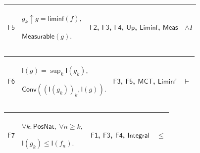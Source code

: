 \documentclass[11pt]{amsart}
\newlength{\FTCFourColumnBody}
\begin{document}
{\noindent
\begin{tabular}{|@{}>{\centering\arraybackslash}m{0.078431\FTCFourColumnBody}|>{\centering\arraybackslash}m{0.535947\FTCFourColumnBody}|>{\centering\arraybackslash}m{0.281045\FTCFourColumnBody}|>{\centering\arraybackslash}m{0.104575\FTCFourColumnBody}|}\hline
\hypertarget{proof:F5}{$\displaystyle \textsf{F5}$} & $\displaystyle g_k\uparrow g=\textsf{liminf}(f),$\par
$\displaystyle \textsf{Measurable}(g).$ & \hyperlink{proof:F2}{$\displaystyle \textsf{F2}$}, \hyperlink{proof:F3}{$\displaystyle \textsf{F3}$}, \hyperlink{proof:F4}{$\displaystyle \textsf{F4}$}, \hyperlink{def:Up}{$\displaystyle \textsf{Up}$}, \hyperlink{def:Liminf}{$\displaystyle \textsf{Liminf}$}, \hyperlink{lem:Meas}{$\displaystyle \textsf{Meas}$} & $\displaystyle \land I$\\ \hline
\end{tabular}%
\par\setlength{\parskip}{0pt}\nointerlineskip
\noindent
\begin{tabular}{|@{}>{\centering\arraybackslash}m{0.078431\FTCFourColumnBody}|>{\centering\arraybackslash}m{0.535947\FTCFourColumnBody}|>{\centering\arraybackslash}m{0.281045\FTCFourColumnBody}|>{\centering\arraybackslash}m{0.104575\FTCFourColumnBody}|}\hline
\hypertarget{proof:F6}{$\displaystyle \textsf{F6}$} & $\displaystyle \textsf{I}(g)=\sup_k\textsf{I}(g_k),$\par
$\displaystyle \textsf{Conv}((\textsf{I}(g_k))_k,\textsf{I}(g)).$ & \hyperlink{proof:F3}{$\displaystyle \textsf{F3}$}, \hyperlink{proof:F5}{$\displaystyle \textsf{F5}$}, \hyperlink{lem:MCT}{$\displaystyle \textsf{MCT}$}, \hyperlink{lem:Liminf}{$\displaystyle \textsf{Liminf}$} & $\displaystyle \vdash$\\ \hline
\end{tabular}%
\par\setlength{\parskip}{0pt}\nointerlineskip
\noindent
\begin{tabular}{|@{}>{\centering\arraybackslash}m{0.078431\FTCFourColumnBody}|>{\centering\arraybackslash}m{0.535947\FTCFourColumnBody}|>{\centering\arraybackslash}m{0.281045\FTCFourColumnBody}|>{\centering\arraybackslash}m{0.104575\FTCFourColumnBody}|}\hline
\hypertarget{proof:F7}{$\displaystyle \textsf{F7}$} & $\displaystyle \forall k:\textsf{PosNat},\ \forall n\ge k,$\par
$\displaystyle \textsf{I}(g_k)\le\textsf{I}(f_n).$ & \hyperlink{proof:F1}{$\displaystyle \textsf{F1}$}, \hyperlink{proof:F3}{$\displaystyle \textsf{F3}$}, \hyperlink{proof:F4}{$\displaystyle \textsf{F4}$}, \hyperlink{lem:Integral}{$\displaystyle \textsf{Integral}$} & $\displaystyle \le$\\ \hline

\end{tabular}}
\end{document}
